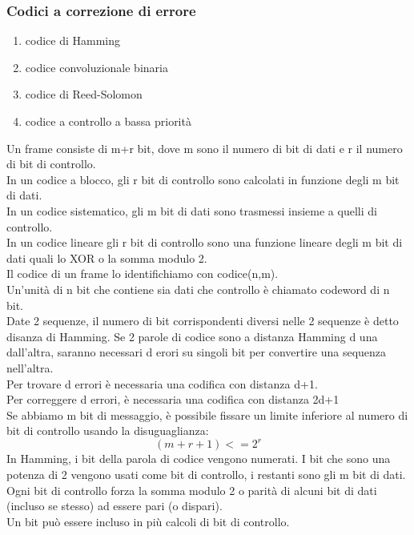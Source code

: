 \documentclass{article}
\begin{document}
\subsubsection{Codici a correzione di errore}
\begin{enumerate}
\item codice di Hamming
\item codice convoluzionale binaria
\item codice di Reed-Solomon
\item codice a controllo a bassa priorità

\end{enumerate}
Un frame consiste di m+r bit, dove m sono il numero di bit di dati e r il numero di bit di controllo.\\
In un codice a blocco, gli r bit di controllo sono calcolati in funzione degli m bit di dati. \\
In un codice sistematico, gli m bit di dati sono trasmessi insieme a quelli di controllo.\\
In un codice lineare gli r bit di controllo sono una funzione lineare degli m bit di dati quali lo XOR o la somma modulo 2. \\
Il codice di un frame lo identifichiamo con codice(n,m). \\
Un'unità di n bit che contiene sia dati che controllo è chiamato codeword di n bit. \\
Date 2 sequenze, il numero di bit corrispondenti diversi nelle 2 sequenze è detto disanza di Hamming. Se 2 parole di codice sono a distanza Hamming d una dall'altra, saranno necessari d erori su singoli bit per convertire una sequenza nell'altra.\\
Per trovare d errori è necessaria una codifica con distanza d+1.\\
Per correggere d errori, è necessaria una codifica con distanza 2d+1\\
Se abbiamo m bit di messaggio, è possibile fissare un limite inferiore al numero di bit di controllo usando la disuguaglianza:
\begin{equation}
	(m+r+1)<= 2^r
\end{equation}
In Hamming, i bit della parola di codice vengono numerati. I bit che sono una potenza di 2 vengono usati come bit di controllo, i restanti sono gli m bit di dati. \\
Ogni bit di controllo forza la somma modulo 2 o parità di alcuni bit di dati (incluso se stesso) ad essere pari (o dispari). \\ Un bit può essere incluso in più calcoli di bit di controllo.\\
\end{document}
